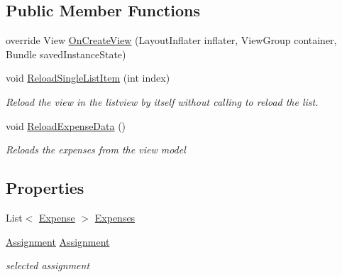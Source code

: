 \subsection*{Public Member Functions}
\begin{DoxyCompactItemize}
\item 
override View \hyperlink{class_field_service_1_1_android_1_1_fragments_1_1_expense_fragment_a4ca84adf640b495bb3c0bb7d673edfff}{On\+Create\+View} (Layout\+Inflater inflater, View\+Group container, Bundle saved\+Instance\+State)
\item 
void \hyperlink{class_field_service_1_1_android_1_1_fragments_1_1_expense_fragment_ac85492bf40dba86aa02a6d3df4ba134c}{Reload\+Single\+List\+Item} (int index)
\begin{DoxyCompactList}\small\item\em Reload the view in the listview by itself without calling to reload the list. \end{DoxyCompactList}\item 
void \hyperlink{class_field_service_1_1_android_1_1_fragments_1_1_expense_fragment_a60019ecf4dc1185868a8249b874f1c67}{Reload\+Expense\+Data} ()
\begin{DoxyCompactList}\small\item\em Reloads the expenses from the view model \end{DoxyCompactList}\end{DoxyCompactItemize}
\subsection*{Properties}
\begin{DoxyCompactItemize}
\item 
List$<$ \hyperlink{class_field_service_1_1_data_1_1_expense}{Expense} $>$ \hyperlink{class_field_service_1_1_android_1_1_fragments_1_1_expense_fragment_a36a612c9607ef8dc94562e5321f1405d}{Expenses}
\item 
\hyperlink{class_field_service_1_1_data_1_1_assignment}{Assignment} \hyperlink{class_field_service_1_1_android_1_1_fragments_1_1_expense_fragment_a9f4d0d751e18f6c98b6266aadeea4e43}{Assignment}
\begin{DoxyCompactList}\small\item\em selected assignment \end{DoxyCompactList}\end{DoxyCompactItemize}


